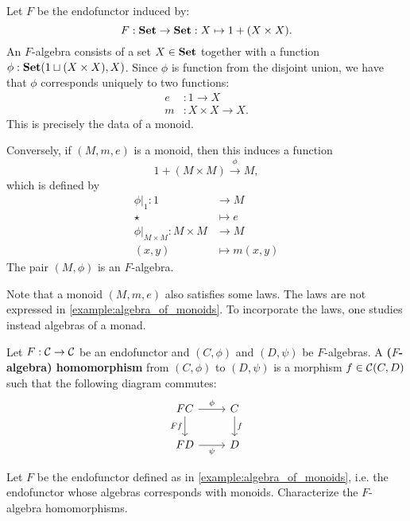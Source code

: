 \begin{exa}\label{example:algebra_of_monoids} Let $F$ be the endofunctor induced by:
\[
F: \mathbf{Set} \to \mathbf{Set}: X \mapsto 1 + (X\times X).
\]
An $F$-algebra consists of a set $X\in\mathbf{Set}$ together with a function $\phi:{\mathbf{Set}}(1\sqcup (X\times X),X)$. Since $\phi$ is function from the disjoint union, we have that $\phi$ corresponds uniquely to two functions:
\begin{align*}
e &: 1\to X
\\
m &: X\times X\to X.
\end{align*}
This is precisely the data of a monoid.

Conversely, if $(M,m,e)$ is a monoid, then this induces a function
\[
1 + (M\times M) \xrightarrow{\phi} M,
\]
which is defined by 
\begin{align*}
\phi\vert_{1} : 1 &\to M
\\
\star &\mapsto e
\\
\phi\vert_{M\times M} : M\times M &\to M 
\\
(x,y) &\mapsto m(x,y)
\end{align*}
The pair $(M, \phi)$ is an $F$-algebra.

\end{exa}

\begin{rem}
 Note that a monoid $(M,m,e)$ also satisfies some laws.
 The laws are not expressed in \cref{example:algebra_of_monoids}.
 To incorporate the laws, one studies instead algebras of a monad.
\end{rem}


\begin{dfn}\label{dfn:alg-hom}
Let $F:\mathcal{C}\to \mathcal{C}$ be an endofunctor and $(C,\phi)$ and $(D,\psi)$ be $F$-algebras. 
A \textbf{($F$-algebra) homomorphism} from $(C,\phi)$ to $(D,\psi)$ is a morphism $f\in {\mathcal{C}}(C,D)$ such that the following diagram commutes:
\[
\begin{tikzcd}
FC
\arrow[r, "\phi"] 
\arrow[d,swap, "Ff"]
& C 
\arrow[d, "f"] 
\\
FD
\arrow[r, swap, "\psi"] 
& D
\end{tikzcd}
\]
\end{dfn}



\begin{exer} 
Let $F$ be the endofunctor defined as in \cref{example:algebra_of_monoids}, 
i.e. the endofunctor whose algebras corresponds with monoids. 
Characterize the $F$-algebra homomorphisms.
\end{exer}

